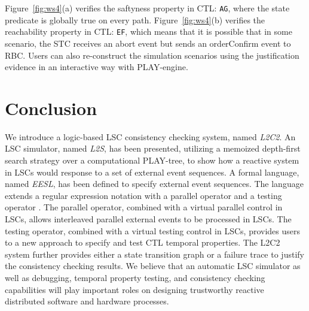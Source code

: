 \documentclass[]{llncs}
\begin{document}
Figure~\ref{fig:ws4}(a) verifies the saftyness property
in CTL: {\tt AG}, where the state
predicate is globally true on every path.
Figure~\ref{fig:ws4}(b) verifies the reachability property
in CTL: {\tt EF},
which means that it is possible that in some scenario,
the STC receives an abort event but sends an orderConfirm event to
RBC. Users can also re-construct the simulation scenarios using the
justification evidence in an interactive way with PLAY-engine.


\section{Conclusion}
\label{sec:conclusion}


We introduce a logic-based LSC consistency checking system,
named {\em L2C2}. An LSC simulator, named {\em L2S},
has been presented, utilizing a memoized depth-first search strategy
over a computational PLAY-tree, to show how a reactive system in LSCs
would response to a set of external event sequences.
A formal language, named {\em EESL}, has been defined
to specify external event sequences. The language extends
a regular expression notation with a parallel operator 
and a testing operator .
The parallel operator, combined with a virtual parallel control in LSCs,
allows interleaved parallel external events to be processed in LSCs.
The testing operator, combined with a virtual testing control in LSCs,
provides users to a new approach to specify and test CTL temporal properties.
The L2C2 system further provides either a state transition graph or
a failure trace to justify the consistency checking results.
We believe that an automatic LSC simulator as well as
debugging, temporal property testing, and consistency checking
capabilities will play important roles on designing trustworthy
reactive distributed software and hardware processes.
\end{document}

